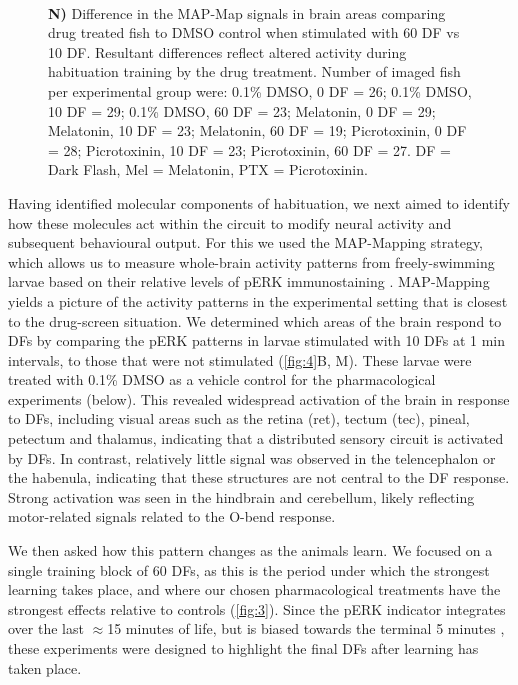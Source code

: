 \documentclass[9pt,lineno]{RandlettLab_elife}
\begin{document}
\begin{figure}
\begin{fullwidth}
\begin{center}
{\\ \textbf{N)} Difference in the MAP-Map signals in brain areas comparing drug treated fish to DMSO control when stimulated with 60 DF vs 10 DF. Resultant differences reflect altered activity during habituation training by the drug treatment. 
Number of imaged fish per experimental group were: 0.1\% DMSO, 0 DF = 26; 0.1\% DMSO, 10 DF = 29; 0.1\% DMSO, 60 DF = 23; Melatonin, 0 DF = 29; Melatonin, 10 DF = 23; Melatonin, 60 DF = 19; Picrotoxinin, 0 DF = 28; Picrotoxinin, 10 DF = 23; Picrotoxinin, 60 DF = 27.
DF = Dark Flash, Mel = Melatonin, PTX = Picrotoxinin. }
\label{fig:4}
\end{center}
\end{fullwidth}
\end{figure}

Having identified molecular components of habituation, we next aimed to identify how these molecules act within the circuit to modify neural activity and subsequent behavioural output. For this we used the MAP-Mapping strategy, which allows us to measure whole-brain activity patterns from freely-swimming larvae based on their relative levels of pERK immunostaining \cite{Randlett2015-hy}. MAP-Mapping yields a picture of the activity patterns in the experimental setting that is closest to the drug-screen situation. We determined which areas of the brain respond to DFs by comparing the pERK patterns in larvae stimulated with 10 DFs at 1 min intervals, to those that were not stimulated (\autoref{fig:4}B, M). These larvae were treated with 0.1\% DMSO as a vehicle control for the pharmacological experiments (below). This revealed widespread activation of the brain in response to DFs, including visual areas such as the retina (ret), tectum (tec), pineal, petectum and thalamus, indicating that a distributed sensory circuit is activated by DFs. In contrast, relatively little signal was observed in the telencephalon or the habenula, indicating that these structures are not central to the DF response. Strong activation was seen in the hindbrain and cerebellum, likely reflecting motor-related signals related to the O-bend response. 

We then asked how this pattern changes as the animals learn. We focused on a single training block of 60 DFs, as this is the period under which the strongest learning takes place, and where our chosen pharmacological treatments have the strongest effects relative to controls (\autoref{fig:3}). Since the pERK indicator integrates over the last $\approx$15 minutes of life, but is biased towards the terminal 5 minutes \cite{Randlett2015-hy}, these experiments were designed to highlight the final DFs after learning has taken place.
\end{document}
